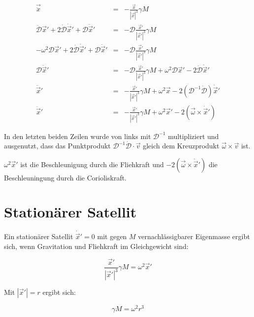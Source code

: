 \documentclass[12pt]{article}
\begin{document}
\begin{eqnarray}
\vec{\ddot{x}} &=& - \frac{\vec{x}}{\left| \vec{x} \right|^3} \gamma M \nonumber \\
\ddot{\mathcal{D}}\vec{x}' + 2 \dot{\mathcal{D}}\dot{\vec{x}}' + \mathcal{D}\ddot{\vec{x}}' &=& - \mathcal{D}\frac{\vec{x}'}{\left| \vec{x}' \right|^3} \gamma M \nonumber \\
-\omega^2\mathcal{D}\vec{x}' + 2 \dot{\mathcal{D}}\dot{\vec{x}}' + \mathcal{D}\ddot{\vec{x}}' &=& - \mathcal{D}\frac{\vec{x}'}{\left| \vec{x}' \right|^3} \gamma M \nonumber \\ 
\mathcal{D}\ddot{\vec{x}}' &=& - \mathcal{D}\frac{\vec{x}'}{\left| \vec{x}' \right|^3} \gamma M + \omega^2\mathcal{D}\vec{x}' - 2 \dot{\mathcal{D}}\dot{\vec{x}}' \nonumber \\
\ddot{\vec{x}}' &=& - \frac{\vec{x}'}{\left| \vec{x}' \right|^3} \gamma M + \omega^2\vec{x} - 2 \left( \mathcal{D}^{-1} \dot{\mathcal{D}}\right)\dot{\vec{x}}' \nonumber \\
\ddot{\vec{x}}' &=& - \frac{\vec{x}'}{\left| \vec{x}' \right|^3} \gamma M + \omega^2\vec{x}' - 2 \left( \vec{\omega} \times \dot{\vec{x}}'\right) \label{eq:translated}
\end{eqnarray}

In den letzten beiden Zeilen wurde von links mit $\mathcal{D}^{-1}$ multipliziert und ausgenutzt, dass das Punktprodukt $\mathcal{D}^{-1}\dot{\mathcal{D}} \cdot \vec{v}$ gleich dem Kreuzprodukt $\vec{\omega}\times\vec{v}$ ist.

$\omega^2\vec{x}'$ ist die Beschleunigung durch die Fliehkraft und $- 2 \left( \vec{\omega} \times \dot{\vec{x}}'\right)$ die Beschleuningung durch die Corioliskraft.

\section{Stationärer Satellit}

Ein stationärer Satellit $\dot{\vec{x}}' = 0$ mit gegen $M$ vernachlässigbarer Eigenmasse ergibt sich, wenn Gravitation und Fliehkraft im Gleichgewicht sind:

\begin{equation}
\frac{\vec{x}'}{\left| \vec{x}' \right|^3} \gamma M = \omega^2\vec{x}' \nonumber
\end{equation}

Mit $\left| \vec{x}' \right| = r$  ergibt sich:

\begin{equation}
\gamma M = \omega^2 r^3 \label{eq:thirdLaw}
\end{equation}
\end{document}
